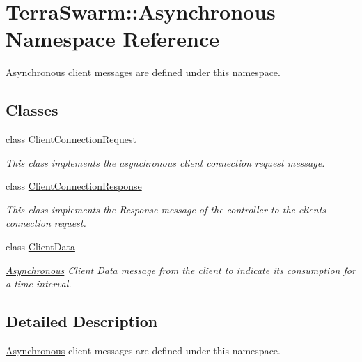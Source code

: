 \hypertarget{namespace_terra_swarm_1_1_asynchronous}{\section{Terra\-Swarm\-:\-:Asynchronous Namespace Reference}
\label{namespace_terra_swarm_1_1_asynchronous}
}


\hyperlink{namespace_terra_swarm_1_1_asynchronous}{Asynchronous} client messages are defined under this namespace.  


\subsection*{Classes}
\begin{DoxyCompactItemize}
\item 
class \hyperlink{class_terra_swarm_1_1_asynchronous_1_1_client_connection_request}{Client\-Connection\-Request}
\begin{DoxyCompactList}\small\item\em This class implements the asynchronous client connection request message. \end{DoxyCompactList}\item 
class \hyperlink{class_terra_swarm_1_1_asynchronous_1_1_client_connection_response}{Client\-Connection\-Response}
\begin{DoxyCompactList}\small\item\em This class implements the Response message of the controller to the clients connection request. \end{DoxyCompactList}\item 
class \hyperlink{class_terra_swarm_1_1_asynchronous_1_1_client_data}{Client\-Data}
\begin{DoxyCompactList}\small\item\em \hyperlink{namespace_terra_swarm_1_1_asynchronous}{Asynchronous} Client Data message from the client to indicate its consumption for a time interval. \end{DoxyCompactList}\end{DoxyCompactItemize}


\subsection{Detailed Description}
\hyperlink{namespace_terra_swarm_1_1_asynchronous}{Asynchronous} client messages are defined under this namespace. 